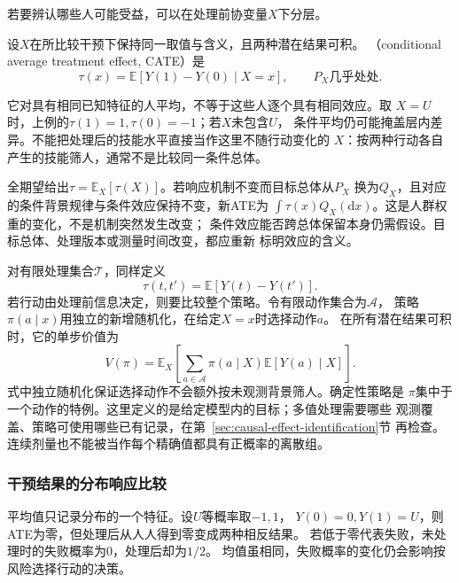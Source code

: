 若要辨认哪些人可能受益，可以在处理前协变量\(X\)下分层。
\begin{definition}[条件平均处理效应]
  \label{def:causal-conditional-average-effect}
  设\(X\)在所比较干预下保持同一取值与含义，且两种潜在结果可积。
  （conditional average treatment effect, CATE）是
  \begin{equation}
    \tau(x)=\mathbb E[Y(1)-Y(0)\mid X=x],
    \qquad P_X\text{几乎处处}.
    \label{eq:causal-cate}
  \end{equation}
\end{definition}
它对具有相同已知特征的人平均，不等于这些人逐个具有相同效应。取
\(X=U\)时，上例的\(\tau(1)=1,\tau(0)=-1\)；若\(X\)未包含\(U\)，
条件平均仍可能掩盖层内差异。不能把处理后的技能水平直接当作这里不随行动变化的
\(X\)：按两种行动各自产生的技能筛人，通常不是比较同一条件总体。

全期望给出\(\tau=\mathbb E_X[\tau(X)]\)。若响应机制不变而目标总体从\(P_X\)
换为\(Q_X\)，且对应的条件背景规律与条件效应保持不变，新ATE为
\(\int\tau(x)Q_X(\mathrm dx)\)。这是人群权重的变化，不是机制突然发生改变；
条件效应能否跨总体保留本身仍需假设。目标总体、处理版本或测量时间改变，都应重新
标明效应的含义。

对有限处理集合\(\mathcal T\)，同样定义
\[
  \tau(t,t')=\mathbb E[Y(t)-Y(t')].
\]
若行动由处理前信息决定，则要比较整个策略。令有限动作集合为\(\mathcal A\)，
策略\(\pi(a\mid x)\)用独立的新增随机化，在给定\(X=x\)时选择动作\(a\)。
在所有潜在结果可积时，它的单步价值为
\begin{equation}
  V(\pi)=\mathbb E_X\left[
    \sum_{a\in\mathcal A}\pi(a\mid X)\mathbb E[Y(a)\mid X]
  \right].
  \label{eq:causal-policy-value}
\end{equation}
式中独立随机化保证选择动作不会额外按未观测背景筛人。确定性策略是
\(\pi\)集中于一个动作的特例。这里定义的是给定模型内的目标；多值处理需要哪些
观测覆盖、策略可使用哪些已有记录，在第~\ref{sec:causal-effect-identification}节
再检查。连续剂量也不能被当作每个精确值都具有正概率的离散组。

\subsubsection{干预结果的分布响应比较}
\label{sec:causal-distribution-response}

平均值只记录分布的一个特征。设\(U\)等概率取\(-1,1\)，
\(Y(0)=0,Y(1)=U\)，则ATE为零，但处理后从人人得到零变成两种相反结果。
若低于零代表失败，未处理时的失败概率为\(0\)，处理后却为\(1/2\)。
均值虽相同，失败概率的变化仍会影响按风险选择行动的决策。

